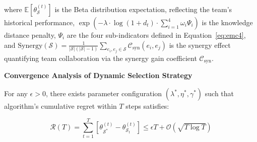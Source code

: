 where $\mathbb{E}[\theta_{\mathcal{S}}^{(t)}]$ is the Beta distribution expectation, reflecting the team's historical performance, $\exp\left(-\lambda \cdot \log(1 + d_t) \cdot \sum_{i=1}^4 \omega_i \Psi_i \right)$ is the knowledge distance penalty, $\Psi_i$ are the four sub-indicators defined in Equation~\eqref{eq:emc4}, and $\mathrm{Synergy}(\mathcal{S}) = \frac{1}{|\mathcal{S}|(|\mathcal{S}|-1)} \sum_{e_i,e_j \in \mathcal{S}} \mathcal{C}_{\text{syn}}(e_i,e_j)$ is the synergy effect quantifying team collaboration via the synergy gain coefficient $\mathcal{C}_{\text{syn}}$.



\textbf{Convergence Analysis of Dynamic Selection Strategy}

\begin{theorem}
For any $\epsilon > 0$, there exists parameter configuration $(\lambda^*, \eta^*, \gamma^*)$ such that algorithm's cumulative regret within $T$ steps satisfies:

\begin{equation}
\mathcal{R}(T) = \sum_{t=1}^T \left[ \theta_{\mathcal{S}^*}^{(t)} - \theta_{\mathcal{S}_t}^{(t)} \right] \leq \epsilon T + \mathcal{O}\left( \sqrt{T \log T} \right)
\tag{7}
\label{eq:emc7}
\end{equation}

\end{theorem}

